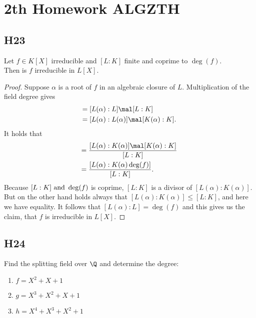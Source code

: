 
\section{2th Homework ALGZTH}
\subsection{H23}
Let $f \in K[X]$ irreducible and $[L:K]$ finite and coprime to $\deg(f)$.\\
Then is $f$ irreducible in $L[X]$.

\begin{proof}
	Suppose $\alpha$ is a root of $f$ in an algebraic closure of $L$. Multiplication of the field degree gives
	\begin{align*}
		[L(\alpha):K] &= [L(\alpha): L] \mal [L:K]\\
		&= [L(\alpha):L(\alpha)]\mal [K(\alpha):K].
	\end{align*}
	It holds that
	\begin{align*}
		[L(\alpha):L] &= \frac{[L(\alpha):K(\alpha)]\mal [K(\alpha): K]}{[L:K]}\\
		&= \frac{[L(\alpha):K(\alpha)\deg(f)]}{[L:K]}.
	\end{align*}
	Because $[L:K] \text{ and } \deg(f)$ is coprime, $[L:K]$ is a divisor of $[L(\alpha):K(\alpha)]$. But on the other hand holds always that $[L(\alpha):K(\alpha)] \le [L:K]$, and here we have equality. It follows that $[L(\alpha):L] = \deg(f)$ and this gives us the claim, that $f$ is irreducible in $L[X]$.
\end{proof}

\subsection{H24}
Find the splitting field over $\Q$ and determine the degree: 
\begin{enumerate}
	\item $f = X^2 + X +1$
	\item $g = X^3 + X^2 + X + 1$
	\item $h = X^4 + X^3 + X^2 + 1$
\end{enumerate}

